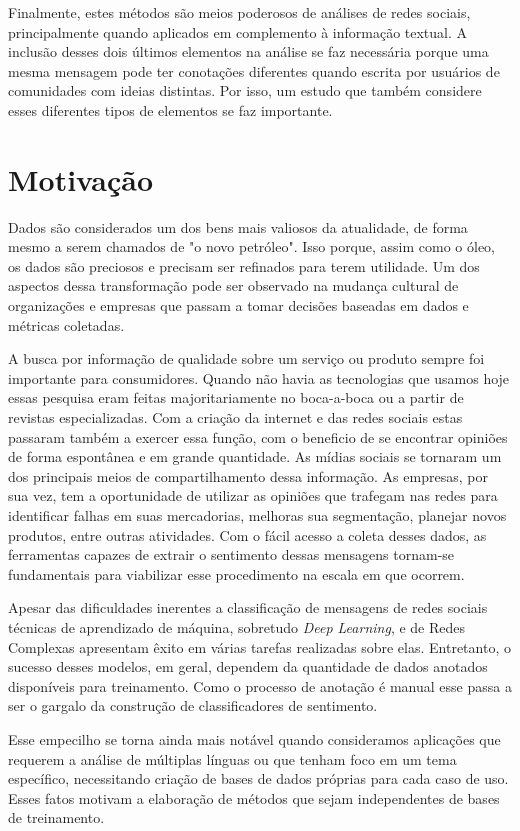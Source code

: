 Finalmente, estes métodos são meios poderosos de análises de redes sociais,
principalmente quando aplicados em complemento à informação textual.
A inclusão desses dois últimos elementos na análise se faz necessária porque uma
mesma mensagem pode ter conotações diferentes quando escrita por usuários de
comunidades com ideias distintas.
Por isso, um estudo que também considere esses diferentes tipos de elementos se
faz importante.

\section{Motivação}

Dados são considerados um dos bens mais valiosos da atualidade, de forma mesmo a
serem chamados de "o novo petróleo".
Isso porque, assim como o óleo, os dados são preciosos e precisam ser refinados
para terem utilidade.
Um dos aspectos dessa transformação pode ser observado na mudança cultural de
organizações e empresas que passam a tomar decisões baseadas em dados e métricas
coletadas.

A busca por informação de qualidade sobre um serviço ou produto sempre foi
importante para consumidores.
Quando não havia as tecnologias que usamos hoje essas pesquisa eram feitas
majoritariamente no boca-a-boca ou a partir de revistas especializadas.
Com a criação da internet e das redes sociais estas passaram também a exercer
essa função, com o beneficio de se encontrar opiniões de forma espontânea e em
grande quantidade.
As mídias sociais se tornaram um dos principais meios de compartilhamento dessa
informação.
As empresas, por sua vez, tem a oportunidade de utilizar as opiniões que
trafegam nas redes para identificar falhas em suas mercadorias, melhoras sua
segmentação, planejar novos produtos, entre outras atividades.
Com o fácil acesso a coleta desses dados, as ferramentas capazes de extrair o
sentimento dessas mensagens tornam-se fundamentais para viabilizar esse
procedimento na escala em que ocorrem.

Apesar das dificuldades inerentes a classificação de mensagens de redes sociais
técnicas de aprendizado de máquina, sobretudo \textit{Deep Learning}, e de Redes
Complexas apresentam êxito em várias tarefas realizadas sobre elas.
Entretanto, o sucesso desses modelos, em geral, dependem da quantidade de dados
anotados disponíveis para treinamento.
Como o processo de anotação é manual esse passa a ser o gargalo da construção de
classificadores de sentimento.

Esse empecilho se torna ainda mais notável quando consideramos aplicações que
requerem a análise de múltiplas línguas ou que tenham foco em um tema
específico, necessitando criação de bases de dados próprias para cada caso de
uso.
Esses fatos motivam a elaboração de métodos que sejam independentes de bases de
treinamento.


